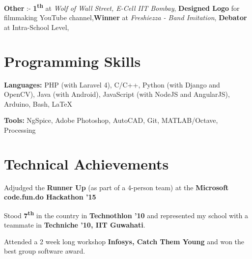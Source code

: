 \documentclass[11pt]{resume}
\begin{document}
\begin{resume}
\begin{list2}
\item \textbf {Other} :- \textbf{1\textsuperscript{th}} at \textsl {Wolf of Wall Street, E-Cell IIT Bombay}, \textbf{Designed Logo} for filmmaking YouTube channel,\textbf{Winner} at \textsl{Freshiezza - Band Imitation},  \textbf{Debator} at Intra-School Level, 

\end{list2}
\section{\mysidestyle Programming Skills}
\begin{list2}
\item \textbf{Languages:} PHP (with Laravel 4), C/C++, Python (with Django and OpenCV), Java (with Android), JavaScript (with NodeJS and AngularJS), Arduino, Bash, \LaTeX
\item \textbf{Tools:} NgSpice, Adobe Photoshop, AutoCAD, Git, MATLAB/Octave, Processing
\end{list2}



\section{\mysidestyle Technical Achievements} 
\begin{list2}
\item Adjudged the \textbf{Runner Up} (as part of a 4-person team) at the \textbf{Microsoft code.fun.do Hackathon '15}

\item Stood \textbf {7\textsuperscript{th}} in the country in \textbf {Technothlon '10} and represented my school with a teammate in \textbf {Techniche '10, IIT Guwahati}. 

\item Attended a 2 week long workshop \textbf{Infosys, Catch Them Young} and won the best group software award. 



\end{list2}





\end{resume}
\end{document}
